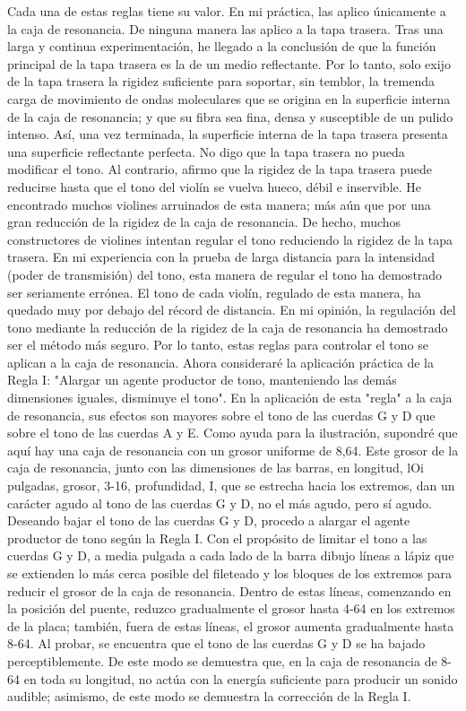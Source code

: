Cada una de estas reglas tiene su valor. En mi práctica, las aplico únicamente a la caja de resonancia. De ninguna manera las aplico a la tapa trasera. Tras una larga y continua experimentación, he llegado a la conclusión de que la función principal de la tapa trasera es la de un medio reflectante. Por lo tanto, solo exijo de la tapa trasera la rigidez suficiente para soportar, sin temblor, la tremenda carga de movimiento de ondas moleculares que se origina en la superficie interna de la caja de resonancia; y que su fibra sea fina, densa y susceptible de un pulido intenso. Así, una vez terminada, la superficie interna de la tapa trasera presenta una superficie reflectante perfecta. No digo que la tapa trasera no pueda modificar el tono. Al contrario, afirmo que la rigidez de la tapa trasera puede reducirse hasta que el tono del violín se vuelva hueco, débil e inservible. He encontrado muchos violines arruinados de esta manera; más aún que por una gran reducción de la rigidez de la caja de resonancia. De hecho, muchos constructores de violines intentan regular el tono reduciendo la rigidez de la tapa trasera. En mi experiencia con la prueba de larga distancia para la intensidad (poder de transmisión) del tono, esta manera de regular el tono ha demostrado ser seriamente errónea. El tono de cada violín, regulado de esta manera, ha quedado muy por debajo del récord de distancia. En mi opinión, la regulación del tono mediante la reducción de la rigidez de la caja de resonancia ha demostrado ser el método más seguro. Por lo tanto, estas reglas para controlar el tono se aplican a la
caja de resonancia.
Ahora consideraré la aplicación práctica de la Regla I: "Alargar un agente productor de tono, manteniendo las demás dimensiones iguales, disminuye el tono". En la aplicación de esta "regla" a la caja de resonancia, sus efectos son mayores sobre el tono de las cuerdas G y D que sobre el tono de las cuerdas A y E. Como ayuda para la ilustración, supondré que aquí hay una caja de resonancia con un grosor uniforme de 8,64. Este grosor de la caja de resonancia, junto con las dimensiones de las barras, en longitud,
lOi pulgadas, grosor, 3-16, profundidad, I, que se estrecha hacia los extremos, dan un carácter agudo al tono de las cuerdas G y D, no el más agudo, pero sí agudo. Deseando bajar el tono de las cuerdas G y D, procedo a alargar el agente productor de tono según la Regla I. Con el propósito de limitar el tono a las cuerdas G y D, a media pulgada a cada lado de la barra dibujo líneas a lápiz que se extienden lo más cerca posible del fileteado y los bloques de los extremos para reducir el grosor de la caja de resonancia. Dentro de estas líneas, comenzando en la posición del puente, reduzco gradualmente el grosor hasta 4-64 en los extremos de la placa; también, fuera de estas líneas, el grosor aumenta gradualmente hasta 8-64. Al probar, se encuentra que el tono de las cuerdas G y D se ha bajado perceptiblemente. De este modo se demuestra que, en la caja de resonancia de 8-64 en toda su longitud, no actúa con la energía suficiente para producir un sonido audible; asimismo, de este modo se demuestra la corrección de la Regla I.

